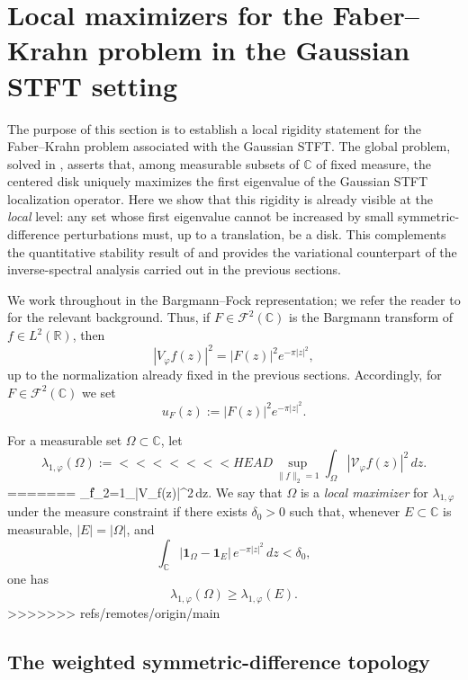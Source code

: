 \documentclass[a4paper,11pt,reqno]{amsart}
\numberwithin{equation}{section}
\theoremstyle{plain} %
\theoremstyle{definition} %
\theoremstyle{remark}
\newcommand{\R}{\mathbb{R}}
\newcommand{\C}{\mathbb{C}}
\begin{document}

\section{Local maximizers for the Faber--Krahn problem in the Gaussian STFT setting}\label{sec:local-max}

The purpose of this section is to establish a local rigidity statement for the
Faber--Krahn problem associated with the Gaussian STFT. The global problem,
solved in \cite{Nicola-Tilli}, asserts that, among measurable subsets of \(\C\)
of fixed measure, the centered disk uniquely maximizes the first eigenvalue of
the Gaussian STFT localization operator. Here we show that this rigidity is
already visible at the \emph{local} level: any set whose first eigenvalue cannot
be increased by small symmetric-difference perturbations must, up to a
translation, be a disk. This complements the quantitative stability result of
\cite{Gomez-Guerra-Ramos-Tilli} and provides the variational counterpart of the
inverse-spectral analysis carried out in the previous sections.

We work throughout in the Bargmann--Fock representation; we refer the reader to
\cite{Bargmann,Folland,Grochenig} for the relevant background. Thus, if
\(F\in \mathcal F^2(\C)\) is the Bargmann transform of \(f\in L^2(\R)\), then
\[
|V_\varphi f(z)|^2 = |F(z)|^2 e^{-\pi |z|^2},
\]
up to the normalization already fixed in the previous sections. Accordingly, for
\(F\in \mathcal F^2(\C)\) we set
\[
u_F(z):=|F(z)|^2 e^{-\pi |z|^2}.
\]

For a measurable set \(\Omega\subset \C\), let
\begin{equation}\label{eq:lambda1-def-sec6}
\lambda_{1,\varphi}(\Omega)
:=
<<<<<<< HEAD
\sup_{\|f\|_2=1}\int_\Omega |\mathcal V_\varphi f(z)|^2\,dz.
\end{equation}
=======
\sup_{\|f\|_2=1}\int_\Omega |V_\varphi f(z)|^2\,dz.
\]
We say that \(\Omega\) is a \emph{local maximizer} for \(\lambda_{1,\varphi}\) under the
measure constraint if there exists \(\delta_0>0\) such that, whenever
\(E\subset \C\) is measurable, \(|E|=|\Omega|\), and
\[
\int_\C |\mathbf 1_\Omega-\mathbf 1_E|\,e^{-\pi |z|^2}\,dz<\delta_0,
\]
one has
\[
\lambda_{1,\varphi}(\Omega)\ge \lambda_{1,\varphi}(E).
\]
>>>>>>> refs/remotes/origin/main

\subsection{The weighted symmetric-difference topology}
\end{document}

